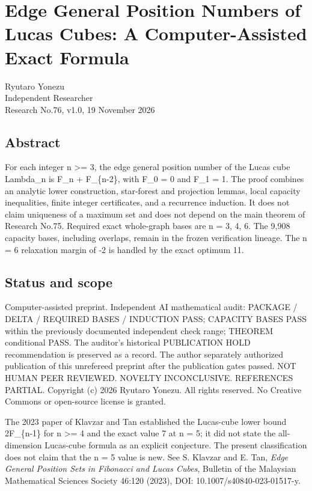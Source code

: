 \documentclass[
  10pt,
]{article}
\author{}
\date{}
\begin{document}
{
\setcounter{tocdepth}{3}
\tableofcontents
}
\section{Edge General Position Numbers of Lucas Cubes: A
Computer-Assisted Exact
Formula}\label{edge-general-position-numbers-of-lucas-cubes-a-computer-assisted-exact-formula}

Ryutaro Yonezu\\
Independent Researcher\\
Research No.76, v1.0, 19 November 2026

\subsection{Abstract}\label{abstract}

For each integer n \textgreater= 3, the edge general position number of
the Lucas cube Lambda\_n is F\_n + F\_\{n-2\}, with F\_0 = 0 and F\_1 =
1. The proof combines an analytic lower construction, star-forest and
projection lemmas, local capacity inequalities, finite integer
certificates, and a recurrence induction. It does not claim uniqueness
of a maximum set and does not depend on the main theorem of Research
No.75. Required exact whole-graph bases are n = 3, 4, 6. The 9,908
capacity bases, including overlaps, remain in the frozen verification
lineage. The n = 6 relaxation margin of -2 is handled by the exact
optimum 11.

\subsection{Status and scope}\label{status-and-scope}

Computer-assisted preprint. Independent AI mathematical audit: PACKAGE /
DELTA / REQUIRED BASES / INDUCTION PASS; CAPACITY BASES PASS within the
previously documented independent check range; THEOREM conditional PASS.
The auditor's historical PUBLICATION HOLD recommendation is preserved as
a record. The author separately authorized publication of this
unrefereed preprint after the publication gates passed. NOT HUMAN PEER
REVIEWED. NOVELTY INCONCLUSIVE. REFERENCES PARTIAL. Copyright (c) 2026
Ryutaro Yonezu. All rights reserved. No Creative Commons or open-source
license is granted.

The 2023 paper of Klavzar and Tan established the Lucas-cube lower bound
2F\_\{n-1\} for n \textgreater= 4 and the exact value 7 at n = 5; it did
not state the all-dimension Lucas-cube formula as an explicit
conjecture. The present classification does not claim that the n = 5
value is new. See S. Klavzar and E. Tan, \emph{Edge General Position
Sets in Fibonacci and Lucas Cubes}, Bulletin of the Malaysian
Mathematical Sciences Society 46:120 (2023), DOI:
10.1007/s40840-023-01517-y.
\end{document}
